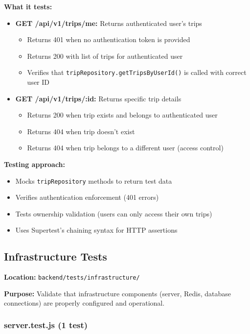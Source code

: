 \textbf{What it tests:}
\begin{itemize}
    \item \textbf{GET /api/v1/trips/me:} Returns authenticated user's trips
    \begin{itemize}
        \item Returns 401 when no authentication token is provided
        \item Returns 200 with list of trips for authenticated user
        \item Verifies that \texttt{tripRepository.getTripsByUserId()} is called with correct user ID
    \end{itemize}
    
    \item \textbf{GET /api/v1/trips/:id:} Returns specific trip details
    \begin{itemize}
        \item Returns 200 when trip exists and belongs to authenticated user
        \item Returns 404 when trip doesn't exist
        \item Returns 404 when trip belongs to a different user (access control)
    \end{itemize}
\end{itemize}

\textbf{Testing approach:}
\begin{itemize}
    \item Mocks \texttt{tripRepository} methods to return test data
    \item Verifies authentication enforcement (401 errors)
    \item Tests ownership validation (users can only access their own trips)
    \item Uses Supertest's chaining syntax for HTTP assertions
\end{itemize}

\subsection{Infrastructure Tests}
\label{subsec:infrastructure_tests}

\textbf{Location:} \texttt{backend/tests/infrastructure/}

\textbf{Purpose:} Validate that infrastructure components (server, Redis, database connections) are properly configured and operational.

\subsubsection{server.test.js (1 test)}
\label{subsubsec:server_test}

